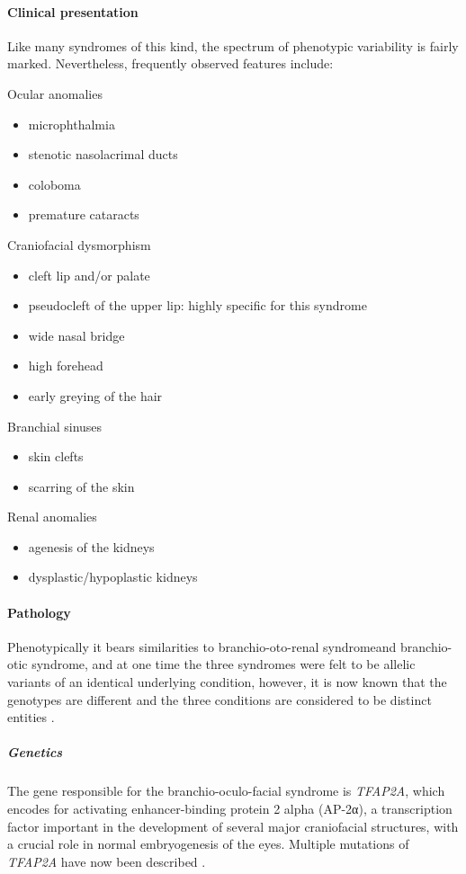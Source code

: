 \paragraph{Clinical presentation}

Like many syndromes of this kind, the spectrum of phenotypic variability is fairly marked. Nevertheless, frequently observed features include:

Ocular anomalies

\begin{itemize}
	\tightlist
	\item
	microphthalmia
	\item
	stenotic nasolacrimal ducts
	\item
	coloboma
	\item
	premature cataracts
\end{itemize}

Craniofacial dysmorphism

\begin{itemize}
	\tightlist
	\item
	cleft lip and/or palate
	\item
	pseudocleft of the upper lip: highly specific for this syndrome
	\item
	wide nasal bridge
	\item
	high forehead
	\item
	early greying of the hair
\end{itemize}

Branchial sinuses

\begin{itemize}
	\tightlist
	\item
	skin clefts
	\item
	scarring of the skin
\end{itemize}

Renal anomalies

\begin{itemize}
	\tightlist
	\item
	agenesis of the kidneys
	\item
	dysplastic/hypoplastic kidneys
\end{itemize}

\paragraph{Pathology}

Phenotypically it bears similarities to branchio-oto-renal syndromeand branchio-otic syndrome, and at one time the three syndromes were felt to be allelic variants of an identical underlying condition, however, it is now known that the genotypes are different and the three conditions are considered to be distinct entities .

\subparagraph{Genetics}

The gene responsible for the branchio-oculo-facial syndrome is \emph{TFAP2A}, which encodes for activating enhancer-binding protein 2 alpha (AP-2α), a transcription factor important in the development of several major craniofacial structures, with a crucial role in normal embryogenesis of the eyes. Multiple mutations of \emph{TFAP2A} have now been described .